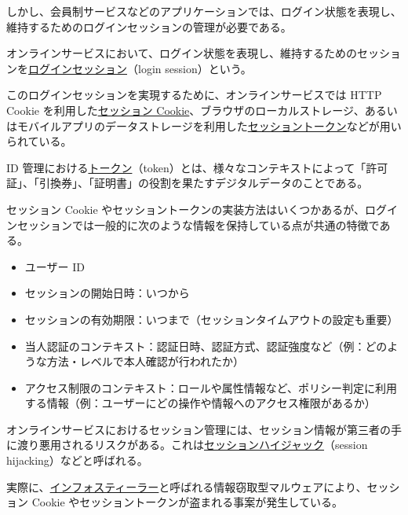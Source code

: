 \documentclass[uplatex]{jsarticle}
\def\label#1{}%
\begin{document}
しかし、会員制サービスなどのアプリケーションでは、ログイン状態を表現し、維持するためのログインセッションの管理が必要である。

\begin{dfn}[ログインセッション]\label{dfn:login-session}
オンラインサービスにおいて、ログイン状態を表現し、維持するためのセッションを\underline{ログインセッション}（login session）という。
\end{dfn}

このログインセッションを実現するために、オンラインサービスでは HTTP Cookie を利用した\underline{セッション Cookie}、ブラウザのローカルストレージ、あるいはモバイルアプリのデータストレージを利用した\underline{セッショントークン}などが用いられている。

\begin{dfn}[トークン]\label{dfn:ch2b-token}
ID 管理における\underline{トークン}（token）とは、様々なコンテキストによって「許可証」、「引換券」、「証明書」の役割を果たすデジタルデータのことである。
\end{dfn}

セッション Cookie やセッショントークンの実装方法はいくつかあるが、ログインセッションでは一般的に次のような情報を保持している点が共通の特徴である。
\begin{itemize}
\item ユーザー ID
\item セッションの開始日時：いつから
\item セッションの有効期限：いつまで（セッションタイムアウトの設定も重要）
\item 当人認証のコンテキスト：認証日時、認証方式、認証強度など（例：どのような方法・レベルで本人確認が行われたか）
\item アクセス制限のコンテキスト：ロールや属性情報など、ポリシー判定に利用する情報（例：ユーザーにどの操作や情報へのアクセス権限があるか）
\end{itemize}

\begin{dfn}[セッションハイジャック]\label{dfn:ch2b-session-hijacking}
オンラインサービスにおけるセッション管理には、セッション情報が第三者の手に渡り悪用されるリスクがある。これは\underline{セッションハイジャック}（session hijacking）などと呼ばれる。
\end{dfn}

\begin{exa}[インフォスティーラーによるセッション情報の窃取]\label{exa:ch2b-infostealer}
実際に、\underline{インフォスティーラー}と呼ばれる情報窃取型マルウェアにより、セッション Cookie やセッショントークンが盗まれる事案が発生している。
\end{exa}
\end{document}
